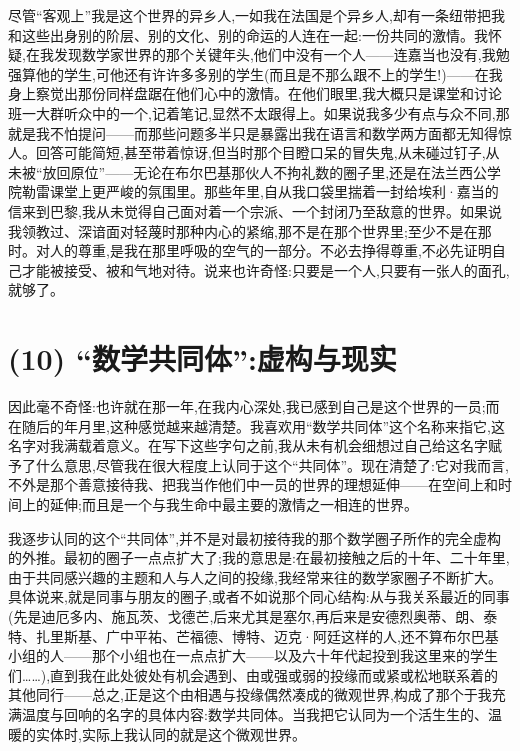 尽管“客观上”我是这个世界的异乡人,一如我在法国是个异乡人,却有一条纽带把我和这些出身别的阶层、别的文化、别的命运的人连在一起:一份共同的激情。我怀疑,在我发现数学家世界的那个关键年头,他们中没有一个人——连嘉当也没有,我勉强算他的学生,可他还有许许多多别的学生(而且是不那么跟不上的学生!)——在我身上察觉出那份同样盘踞在他们心中的激情。在他们眼里,我大概只是课堂和讨论班一大群听众中的一个,记着笔记,显然不太跟得上。如果说我多少有点与众不同,那就是我不怕提问——而那些问题多半只是暴露出我在语言和数学两方面都无知得惊人。回答可能简短,甚至带着惊讶,但当时那个目瞪口呆的冒失鬼,从未碰过钉子,从未被“放回原位”——无论在布尔巴基那伙人不拘礼数的圈子里,还是在法兰西公学院勒雷课堂上更严峻的氛围里。那些年里,自从我口袋里揣着一封给埃利·嘉当的信来到巴黎,我从未觉得自己面对着一个宗派、一个封闭乃至敌意的世界。如果说我领教过、深谙面对轻蔑时那种内心的紧缩,那不是在那个世界里;至少不是在那时。对人的尊重,是我在那里呼吸的空气的一部分。不必去挣得尊重,不必先证明自己才能被接受、被和气地对待。说来也许奇怪:只要是一个人,只要有一张人的面孔,就够了。

\section{(10) “数学共同体”:虚构与现实}

 因此毫不奇怪:也许就在那一年,在我内心深处,我已感到自己是这个世界的一员;而在随后的年月里,这种感觉越来越清楚。我喜欢用“数学共同体”这个名称来指它,这名字对我满载着意义。在写下这些字句之前,我从未有机会细想过自己给这名字赋予了什么意思,尽管我在很大程度上认同于这个“共同体”。现在清楚了:它对我而言,不外是那个善意接待我、把我当作他们中一员的世界的理想延伸——在空间上和时间上的延伸;而且是一个与我生命中最主要的激情之一相连的世界。

 我逐步认同的这个“共同体”,并不是对最初接待我的那个数学圈子所作的完全虚构的外推。最初的圈子一点点扩大了;我的意思是:在最初接触之后的十年、二十年里,由于共同感兴趣的主题和人与人之间的投缘,我经常来往的数学家圈子不断扩大。具体说来,就是同事与朋友的圈子,或者不如说那个同心结构:从与我关系最近的同事(先是迪厄多内、施瓦茨、戈德芒,后来尤其是塞尔,再后来是安德烈奥蒂、朗、泰特、扎里斯基、广中平祐、芒福德、博特、迈克·阿廷这样的人,还不算布尔巴基小组的人——那个小组也在一点点扩大——以及六十年代起投到我这里来的学生们……),直到我在此处彼处有机会遇到、由或强或弱的投缘而或紧或松地联系着的其他同行——总之,正是这个由相遇与投缘偶然凑成的微观世界,构成了那个于我充满温度与回响的名字的具体内容:数学共同体。当我把它认同为一个活生生的、温暖的实体时,实际上我认同的就是这个微观世界。

